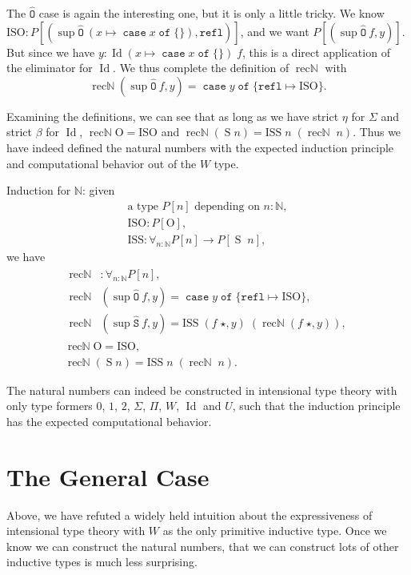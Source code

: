 \documentclass[a4paper,UKenglish,cleveref,nameinlink,autoref,thm-restate]{lipics-v2019}
\newcommand{\zero}{0}
\newcommand{\one}{1}
\newcommand{\bool}{2}
\newcommand{\codeO}{\mathtt{\hat{O}}}
\newcommand{\codeS}{\mathtt{\hat{S}}}
\DeclareMathOperator{\supop}{sup}
\renewcommand{\sup}[2]{\supop {#1}\:\!{#2}}
\newcommand{\N}{\hyperref[define-N]{\mathbb{N}}}
\DeclareMathOperator{\case}{\mathtt{case}}
\newcommand{\caset}[2]{\case {#1}\;\mathtt{of}\;\{{#2}\}}
\DeclareMathOperator{\Idop}{\mathrm{Id}}
\newcommand{\Id}[2]{\Idop {#1}\;{#2}}
\newcommand{\refl}{\mathtt{refl}}
\newcommand{\ISO}{\mathrm{ISO}}
\newcommand{\ISS}{\mathrm{ISS}}
\newcommand{\zerO}{\hyperref[define-O]{\mathrm{O}}}
\DeclareMathOperator{\Succ}{\hyperref[define-S]{S}}
\DeclareMathOperator{\recN}{\mathrm{rec\mathbb{N}}}
\begin{document}
The $\codeO$ case is again the interesting one, but it is only a little tricky. We know $\ISO : P[ (\sup{\codeO}{(x\mapsto\caset{x}{})},\refl)]$, and we want $P[(\sup{\codeO}{f},y)]$. But since we have $y : \Id{(x\mapsto\caset{x}{})}{f}$, this is a direct application of the eliminator for $\Idop$.
We thus complete the definition of $\recN$ with
\begin{equation*}\recN (\sup{\codeO}{f},y) = \caset{y}{\refl \mapsto \ISO}.\end{equation*}

Examining the definitions, we can see that as long as we have strict $\eta$ for $\Sigma$ and strict $\beta$ for $\Idop$, $\recN \zerO = \ISO$ and $\recN(\Succ n) = \ISS\;n\;(\recN\;n)$. Thus we have indeed defined the natural numbers with the expected induction principle and computational behavior out of the $W$ type.

\begin{definition}Induction for $\N$: given
\begin{gather}
\text{a type $P[n]$ depending on $n : \N$},\\
\ISO : P[\zerO],\\
\ISS : \forall_{n : \N}P[n] \to P[\Succ\;n],
\end{gather}
we have
\begin{gather}
\begin{aligned}
\recN& : \forall_{n : \N}P[n],\\
\recN& (\sup{\codeO}{f},y) = \caset{y}{\refl \mapsto \ISO},\\
\recN& (\sup{\codeS}{f},y) = \ISS\;(f\;\star, y)\;(\recN(f\;\star, y)),
\end{aligned}\label{define-recN}\\
\recN \zerO = \ISO\label{recN-eqO},\\
\recN(\Succ n) = \ISS\;n\;(\recN\;n)\label{recN-eqS}.
\end{gather}
\end{definition}

\begin{theorem}
    The natural numbers can indeed be constructed in intensional type theory with only type formers $\zero$, $\one$, $\bool$, $\Sigma$, $\Pi$, $W$, $\Idop$ and $U$, such that the induction principle has the expected computational behavior.
\end{theorem}

\section{The General Case}
Above, we have refuted a widely held intuition about the expressiveness of intensional type theory with $W$ as the only primitive inductive type. Once we know we can construct the natural numbers, that we can construct lots of other inductive types is much less surprising.
\end{document}

